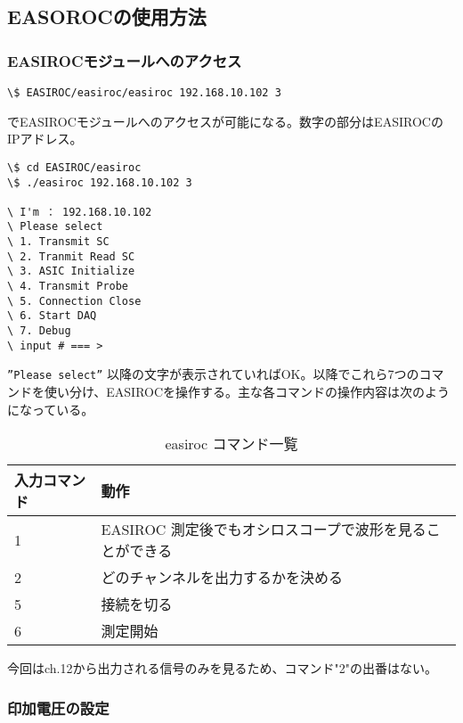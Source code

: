 \documentclass[10pt,a4j]{jarticle}
\begin{document}
\subsection{EASOROCの使用方法}

\subsubsection{EASIROCモジュールへのアクセス}

\begin{lstlisting}[caption=EASIROCモジュールへのアクセス]
  \$ EASIROC/easiroc/easiroc 192.168.10.102 3
\end{lstlisting}
でEASIROCモジュールへのアクセスが可能になる。数字の部分はEASIROCのIPアドレス。

\begin{lstlisting}
\$ cd EASIROC/easiroc
\$ ./easiroc 192.168.10.102 3

\ I'm ： 192.168.10.102
\ Please select
\ 1. Transmit SC
\ 2. Tranmit Read SC
\ 3. ASIC Initialize
\ 4. Transmit Probe
\ 5. Connection Close
\ 6. Start DAQ
\ 7. Debug
\ input # === >
\end{lstlisting}
{\tt ”Please select''} 以降の文字が表示されていればOK。以降でこれら7つのコマンドを使い分け、EASIROCを操作する。主な各コマンドの操作内容は次のようになっている。

\begin{table}[htbp]
  \begin{center}
    \caption{easiroc コマンド一覧}
    \begin{tabular}{|l|l|} \hline
      入力コマンド & 動作 \\ \hline \hline
      1 & EASIROC 測定後でもオシロスコープで波形を見ることができる \\ \hline
      2 & どのチャンネルを出力するかを決める \\ \hline
      5 & 接続を切る \\ \hline
      6 & 測定開始 \\ \hline
    \end{tabular}
  \end{center}
\end{table}

今回はch.12から出力される信号のみを見るため、コマンド"2"の出番はない。

\subsubsection{印加電圧の設定}
\end{document}
